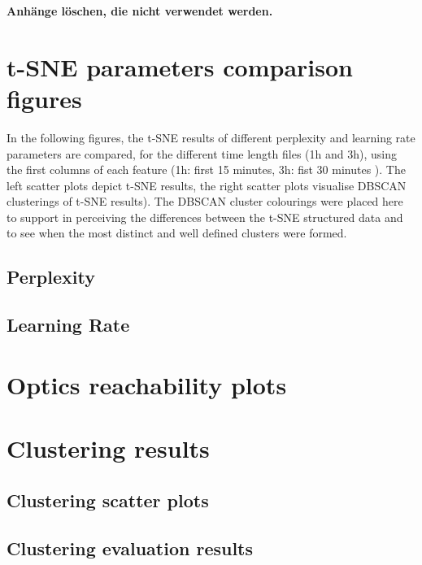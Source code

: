 \begin{appendices}
\textbf{\color{red} Anhänge löschen, die nicht verwendet werden.}

\section{t-SNE parameters comparison figures}
\label{appendix:tSNEParameters}
In the following figures, the t-SNE results of different perplexity and learning rate parameters are compared, for the different time length files (1h and 3h), using the first columns of each feature (1h: first 15 minutes, 3h: fist 30 minutes ). The left scatter plots depict t-SNE results, the right scatter plots visualise DBSCAN clusterings of t-SNE results). The DBSCAN cluster colourings were placed here to support in perceiving the differences between the t-SNE structured data and to see when the most distinct and well defined clusters were formed.

	\subsection{Perplexity}
	\label{appendix:tSNEParametersPerplexity}
	

	\subsection{Learning Rate}
	\label{appendix:tSNEParametersLearningRate}
	


\section{Optics reachability plots}
\label{appendix:OPTICSReachabilityPlots}


\section{Clustering results}

	\subsection{Clustering scatter plots}
	\label{appendix:clusteringResults}
	

	\subsection{Clustering evaluation results}
	\label{appendix:clusteringEvaluationResults}
	




\end{appendices}
